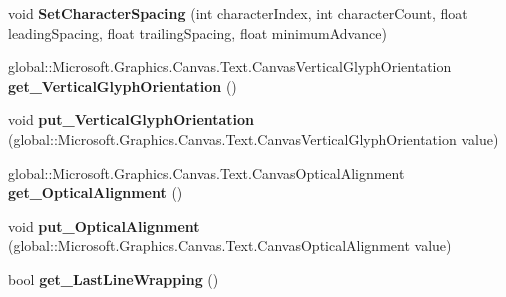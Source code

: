 \begin{DoxyCompactItemize}
\item 
\mbox{\label{interface_microsoft_1_1_graphics_1_1_canvas_1_1_text_1_1_i_canvas_text_layout_a4fe84383740a7e700a50355516d1638a}} 
void {\bfseries Set\+Character\+Spacing} (int character\+Index, int character\+Count, float leading\+Spacing, float trailing\+Spacing, float minimum\+Advance)
\item 
\mbox{\label{interface_microsoft_1_1_graphics_1_1_canvas_1_1_text_1_1_i_canvas_text_layout_a16ecbf654a23cfb935ad2339f832336b}} 
global\+::\+Microsoft.\+Graphics.\+Canvas.\+Text.\+Canvas\+Vertical\+Glyph\+Orientation {\bfseries get\+\_\+\+Vertical\+Glyph\+Orientation} ()
\item 
\mbox{\label{interface_microsoft_1_1_graphics_1_1_canvas_1_1_text_1_1_i_canvas_text_layout_a3745c348ddbf627ac42f367bde371029}} 
void {\bfseries put\+\_\+\+Vertical\+Glyph\+Orientation} (global\+::\+Microsoft.\+Graphics.\+Canvas.\+Text.\+Canvas\+Vertical\+Glyph\+Orientation value)
\item 
\mbox{\label{interface_microsoft_1_1_graphics_1_1_canvas_1_1_text_1_1_i_canvas_text_layout_a6f53ec2716648f680f6930ed036d8ee3}} 
global\+::\+Microsoft.\+Graphics.\+Canvas.\+Text.\+Canvas\+Optical\+Alignment {\bfseries get\+\_\+\+Optical\+Alignment} ()
\item 
\mbox{\label{interface_microsoft_1_1_graphics_1_1_canvas_1_1_text_1_1_i_canvas_text_layout_a766a153760270ab2c01c112374543791}} 
void {\bfseries put\+\_\+\+Optical\+Alignment} (global\+::\+Microsoft.\+Graphics.\+Canvas.\+Text.\+Canvas\+Optical\+Alignment value)
\item 
\mbox{\label{interface_microsoft_1_1_graphics_1_1_canvas_1_1_text_1_1_i_canvas_text_layout_af335bf16dd7057ce2706ba964c165998}} 
bool {\bfseries get\+\_\+\+Last\+Line\+Wrapping} ()
\item 

\end{DoxyCompactItemize}
